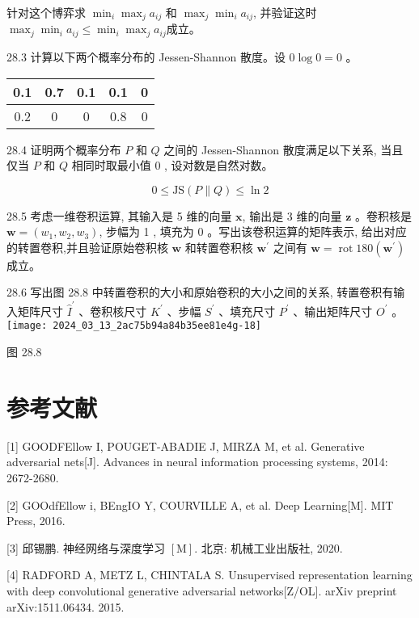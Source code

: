 \documentclass[10pt]{article}
\begin{document}
针对这个博弈求 $\min _{i} \max _{j} a_{i j}$ 和 $\max _{j} \min _{i} a_{i j}$, 并验证这时 $\max _{j} \min _{i} a_{i j} \leqslant \min _{i} \max _{j} a_{i j}$成立。

28.3 计算以下两个概率分布的 Jessen-Shannon 散度。设 $0 \log 0=0$ 。

\begin{center}
\begin{tabular}{c|c|c|c|c}
\hline
0.1 & 0.7 & 0.1 & 0.1 & 0 \\
\hline
0.2 & 0 & 0 & 0.8 & 0 \\
\hline
\end{tabular}
\end{center}

28.4 证明两个概率分布 $P$ 和 $Q$ 之间的 Jessen-Shannon 散度满足以下关系, 当且仅当 $P$ 和 $Q$ 相同时取最小值 0 , 设对数是自然对数。

$$
0 \leqslant \mathrm{JS}(P \| Q) \leqslant \ln 2
$$

28.5 考虑一维卷积运算, 其输入是 5 维的向量 $\boldsymbol{x}$, 输出是 3 维的向量 $\boldsymbol{z}$ 。卷积核是 $\boldsymbol{w}=\left(w_{1}, w_{2}, w_{3}\right)$, 步幅为 1 , 填充为 0 。写出该卷积运算的矩阵表示, 给出对应的转置卷积,并且验证原始卷积核 $\boldsymbol{w}$ 和转置卷积核 $\boldsymbol{w}^{\prime}$ 之间有 $\boldsymbol{w}=\operatorname{rot} 180\left(\boldsymbol{w}^{\prime}\right)$ 成立。

28.6 写出图 28.8 中转置卷积的大小和原始卷积的大小之间的关系, 转置卷积有输入矩阵尺寸 $\hat{I}^{\prime}$ 、卷积核尺寸 $K^{\prime}$ 、步幅 $S^{\prime}$ 、填充尺寸 $P^{\prime}$ 、输出矩阵尺寸 $O^{\prime}$ 。\\
\texttt{[image: 2024\_03\_13\_2ac75b94a84b35ee81e4g-18]}

图 28.8

\section*{参考文献}
[1] GOODFEllow I, POUGET-ABADIE J, MIRZA M, et al. Generative adversarial nets[J]. Advances in neural information processing systems, 2014: 2672-2680.

[2] GOOdfEllow i, BEngIO Y, COURVILLE A, et al. Deep Learning[M]. MIT Press, 2016.

[3] 邱锡鹏. 神经网络与深度学习 $[\mathrm{M}]$. 北京: 机械工业出版社, 2020.

[4] RADFORD A, METZ L, CHINTALA S. Unsupervised representation learning with deep convolutional generative adversarial networks[Z/OL]. arXiv preprint arXiv:1511.06434. 2015.
\end{document}
